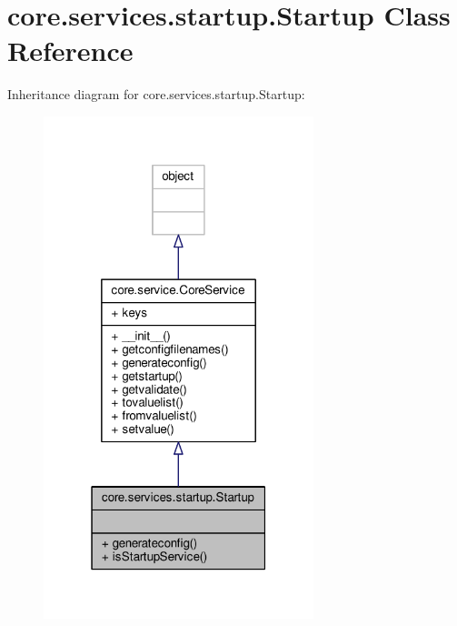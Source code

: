 \hypertarget{classcore_1_1services_1_1startup_1_1_startup}{\section{core.\+services.\+startup.\+Startup Class Reference}
\label{classcore_1_1services_1_1startup_1_1_startup}
}


Inheritance diagram for core.\+services.\+startup.\+Startup\+:
\nopagebreak
\begin{figure}[H]
\begin{center}
\leavevmode
\includegraphics[width=223pt]{classcore_1_1services_1_1startup_1_1_startup__inherit__graph}
\end{center}
\end{figure}


